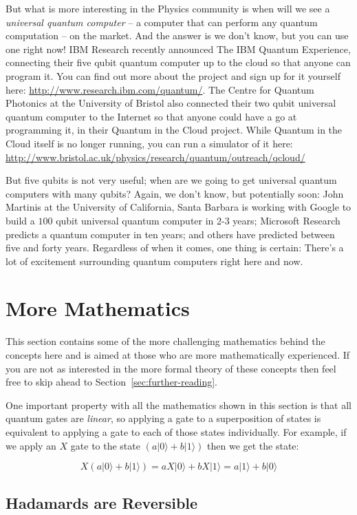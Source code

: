 \documentclass[twocolumn]{article}
\begin{document}
But what is more interesting in the Physics community is when will we see a {\em universal quantum computer} -- a computer that can perform any quantum computation -- on the market. And the answer is we don't know, but you can use one right now! IBM Research recently announced The IBM Quantum Experience, connecting their five qubit quantum computer up to the cloud so that anyone can program it. You can find out more about the project and sign up for it yourself here: \url{http://www.research.ibm.com/quantum/}. The Centre for Quantum Photonics at the University of Bristol also connected their two qubit universal quantum computer to the Internet so that anyone could have a go at programming it, in their Quantum in the Cloud project. While Quantum in the Cloud itself is no longer running, you can run a simulator of it here: \url{http://www.bristol.ac.uk/physics/research/quantum/outreach/qcloud/}

But five qubits is not very useful; when are we going to get universal quantum computers with many qubits? Again, we don't know, but potentially soon: John Martinis at the University of California, Santa Barbara is working with Google to build a $100$ qubit universal quantum computer in 2-3 years; Microsoft Research predicts a quantum computer in ten years; and others have predicted between five and forty years. Regardless of when it comes, one thing is certain: There's a lot of excitement surrounding quantum computers right here and now.

\section{More Mathematics}

This section contains some of the more challenging mathematics behind the concepts here and is aimed at those who are more mathematically experienced. If you are not as interested in the more formal theory of these concepts then feel free to skip ahead to Section~\ref{sec:further-reading}.

One important property with all the mathematics shown in this section is that all quantum gates are {\em linear}, so applying a gate to a superposition of states is equivalent to applying a gate to each of those states individually. For example, if we apply an $X$ gate to the state $(a|0\rangle + b|1\rangle)$ then we get the state:

$$X(a|0\rangle + b|1\rangle) = aX|0\rangle + bX|1\rangle = a|1\rangle + b|0\rangle$$

\subsection{Hadamards are Reversible}
\label{subsec:maths-hadamard}
\end{document}
